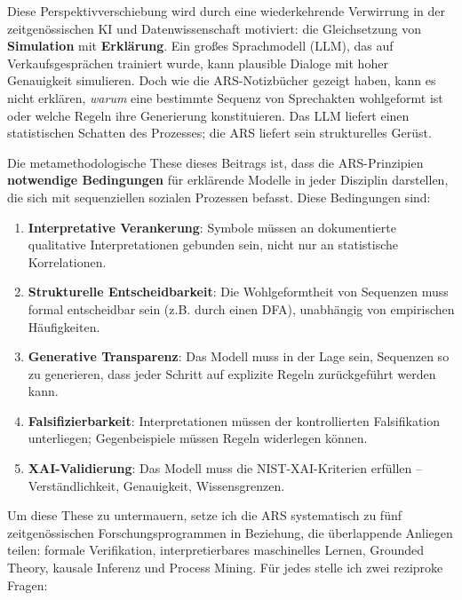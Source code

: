 \documentclass[12pt,a4paper]{article}
\begin{document}
Diese Perspektivverschiebung wird durch eine wiederkehrende Verwirrung in der 
zeitgenössischen KI und Datenwissenschaft motiviert: die Gleichsetzung von 
\textbf{Simulation} mit \textbf{Erklärung}. Ein großes Sprachmodell (LLM), das 
auf Verkaufsgesprächen trainiert wurde, kann plausible Dialoge mit hoher 
Genauigkeit simulieren. Doch wie die ARS-Notizbücher gezeigt haben, kann es 
nicht erklären, \textit{warum} eine bestimmte Sequenz von Sprechakten wohlgeformt 
ist oder welche Regeln ihre Generierung konstituieren. Das LLM liefert einen 
statistischen Schatten des Prozesses; die ARS liefert sein strukturelles Gerüst.

Die metamethodologische These dieses Beitrags ist, dass die ARS-Prinzipien 
\textbf{notwendige Bedingungen} für erklärende Modelle in jeder Disziplin 
darstellen, die sich mit sequenziellen sozialen Prozessen befasst. Diese 
Bedingungen sind:

\begin{enumerate}
    \item \textbf{Interpretative Verankerung}: Symbole müssen an dokumentierte 
    qualitative Interpretationen gebunden sein, nicht nur an statistische 
    Korrelationen.
    
    \item \textbf{Strukturelle Entscheidbarkeit}: Die Wohlgeformtheit von 
    Sequenzen muss formal entscheidbar sein (z.B. durch einen DFA), unabhängig 
    von empirischen Häufigkeiten.
    
    \item \textbf{Generative Transparenz}: Das Modell muss in der Lage sein, 
    Sequenzen so zu generieren, dass jeder Schritt auf explizite Regeln 
    zurückgeführt werden kann.
    
    \item \textbf{Falsifizierbarkeit}: Interpretationen müssen der kontrollierten 
    Falsifikation unterliegen; Gegenbeispiele müssen Regeln widerlegen können.
    
    \item \textbf{XAI-Validierung}: Das Modell muss die NIST-XAI-Kriterien 
    erfüllen – Verständlichkeit, Genauigkeit, Wissensgrenzen.
\end{enumerate}

Um diese These zu untermauern, setze ich die ARS systematisch zu fünf zeitgenössischen 
Forschungsprogrammen in Beziehung, die überlappende Anliegen teilen: formale 
Verifikation, interpretierbares maschinelles Lernen, Grounded Theory, kausale 
Inferenz und Process Mining. Für jedes stelle ich zwei reziproke Fragen:
\end{document}
